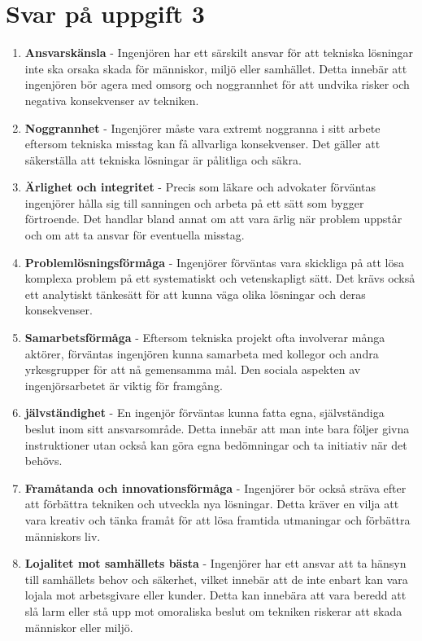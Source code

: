 \documentclass[a4paper,12pt]{article}
\begin{document}
\section*{Svar på uppgift 3}
\begin{enumerate}
    \item \textbf{Ansvarskänsla} - Ingenjören har ett särskilt ansvar för att
          tekniska lösningar inte ska orsaka skada för människor, miljö eller
          samhället. Detta innebär att ingenjören bör agera med omsorg och
          noggrannhet för att undvika risker och negativa konsekvenser av tekniken.
    \item \textbf{Noggrannhet} - Ingenjörer måste vara extremt noggranna i sitt
          arbete eftersom tekniska misstag kan få allvarliga konsekvenser. Det gäller
          att säkerställa att tekniska lösningar är pålitliga och säkra.
    \item \textbf{Ärlighet och integritet} - Precis som läkare och advokater
          förväntas ingenjörer hålla sig till sanningen och arbeta på ett sätt som
          bygger förtroende. Det handlar bland annat om att vara ärlig när problem
          uppstår och om att ta ansvar för eventuella misstag.
    \item \textbf{Problemlösningsförmåga} - Ingenjörer förväntas vara skickliga
          på att lösa komplexa problem på ett systematiskt och vetenskapligt sätt.
          Det krävs också ett analytiskt tänkesätt för att kunna väga olika lösningar
          och deras konsekvenser.
    \item \textbf{Samarbetsförmåga} - Eftersom tekniska projekt ofta involverar
          många aktörer, förväntas ingenjören kunna samarbeta med kollegor och andra
          yrkesgrupper för att nå gemensamma mål. Den sociala aspekten av
          ingenjörsarbetet är viktig för framgång.
    \item \textbf{jälvständighet} - En ingenjör förväntas kunna fatta egna,
          självständiga beslut inom sitt ansvarsområde. Detta innebär att man inte
          bara följer givna instruktioner utan också kan göra egna bedömningar och ta
          initiativ när det behövs.
    \item \textbf{Framåtanda och innovationsförmåga} - Ingenjörer bör också
          sträva efter att förbättra tekniken och utveckla nya lösningar. Detta
          kräver en vilja att vara kreativ och tänka framåt för att lösa framtida
          utmaningar och förbättra människors liv.
    \item \textbf{Lojalitet mot samhällets bästa} - Ingenjörer har ett ansvar
          att ta hänsyn till samhällets behov och säkerhet, vilket innebär att de
          inte enbart kan vara lojala mot arbetsgivare eller kunder. Detta kan
          innebära att vara beredd att slå larm eller stå upp mot omoraliska beslut
          om tekniken riskerar att skada människor eller miljö.
\end{enumerate}
%
\end{document}
